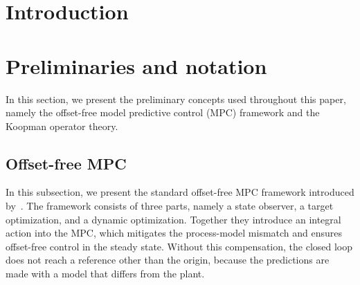 \documentclass[preprint,12pt,authoryear]{elsarticle}
\theoremstyle{remark}
\begin{document}

\section{Introduction}
\label{sec:intro}

\section{Preliminaries and notation}
\label{sec:Preliminaries}

In this section, we present the preliminary concepts used throughout this paper, namely the offset-free model predictive control (MPC) framework and the Koopman operator theory.
 
\subsection{Offset-free MPC}
In this subsection, we present the standard offset-free MPC framework introduced by~\cite{pannocchia2003disturbance}. The framework consists of three parts, namely a state observer, a target optimization, and a dynamic optimization. Together they introduce an integral action into the MPC, which mitigates the process-model mismatch and ensures offset-free control in the steady state. Without this compensation, the closed loop does not reach a reference other than the origin, because the predictions are made with a model that differs from the plant.
\end{document}
